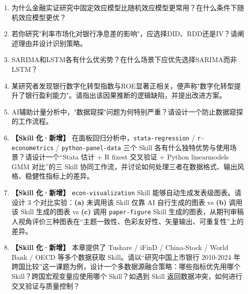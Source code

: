 \begin{exercisebox}[思考题]
\begin{enumerate}[leftmargin=2em]
  \item 为什么金融实证研究中固定效应模型比随机效应模型更常用？在什么条件下随机效应模型更优？
  \item 若你研究"利率市场化对银行净息差的影响"，应选择DID、RDD还是IV？请阐述理由并设计识别策略。
  \item SARIMA和LSTM各有什么优劣势？在什么场景下应优先选择SARIMA而非LSTM？
  \item 某研究者发现银行数字化转型指数与ROE显著正相关，便声称"数字化转型提升了银行盈利能力"。请指出该因果推断的逻辑缺陷，并提出改进方案。
  \item AI辅助计量分析中，"数据窥探"问题为何特别严重？请设计一个防止数据窥探的工作流程。
  \item \textbf{【Skill 化·新增】} 在面板回归分析中，\texttt{stata-regression} / \texttt{r-econometrics} / \texttt{python-panel-data} 三个 Skill 各有什么独特优势与使用场景？请设计一个“Stata 估计 + R fixest 交叉验证 + Python linearmodels GMM 对比”的三 Skill 协同工作流，并讨论如何处理三者在数据格式、输出风格、稳健性指标上的差异。
  \item \textbf{【Skill 化·新增】} \texttt{econ-visualization} Skill 能够自动生成发表级图表。请设计 3 个对比实验：\textbf{(a)} 未调用该 Skill 仅靠 AI 自行生成的图表 vs \textbf{(b)} 调用该 Skill 生成的图表 vs \textbf{(c)} 调用 \texttt{paper-figure} Skill 生成的图表，从期刊审稿人视角评价三种图表在“主题一致性、色彩友好性、矢量输出、可重复性”上的差异。
  \item \textbf{【Skill 化·新增】} 本章提供了 Tushare / iFinD / China-Stock / World Bank / OECD 等多个数据获取 Skill。请以“研究中国上市银行 2010-2024 年跨国比较”这一课题为例，设计一个多数据源融合策略：哪些指标优先用哪个 Skill？跨国宏观变量应使用哪个 Skill？如遇到 Skill 返回数据冲突，如何进行交叉验证与质量控制？
\end{enumerate}
\end{exercisebox}

